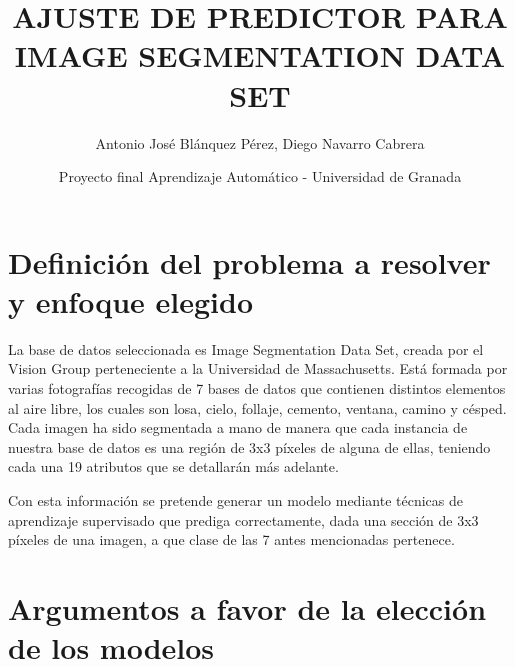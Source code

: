 \documentclass{article}
\title{AJUSTE DE PREDICTOR PARA IMAGE SEGMENTATION DATA SET}
\author{Antonio José Blánquez Pérez, Diego Navarro Cabrera}
\date{Proyecto final Aprendizaje Automático - Universidad de Granada}
\begin{document}
 \setlength{\parskip}{1em} 

	\maketitle
	
	
	

	\section{Definición del problema a resolver y enfoque elegido} %
	La base de datos seleccionada es Image Segmentation Data Set, creada por el Vision Group perteneciente a la Universidad de Massachusetts. Está formada por varias fotografías recogidas de 7 bases de datos que contienen distintos elementos al aire libre, los cuales son losa, cielo, follaje, cemento, ventana, camino y césped. Cada imagen ha sido segmentada a mano de manera que cada instancia de nuestra base de datos es una región de 3x3 píxeles de alguna de ellas, teniendo cada una 19 atributos que se detallarán más adelante. 
	\par
	Con esta información se pretende generar un modelo mediante técnicas de aprendizaje supervisado que prediga correctamente, dada una sección de 3x3 píxeles de una imagen, a que clase de las 7 antes mencionadas pertenece.
	
	\section{Argumentos a favor de la elección de los modelos} %
	
\end{document}
